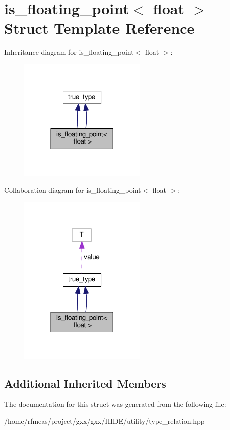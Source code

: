 \hypertarget{structis__floating__point_3_01float_01_4}{}\section{is\+\_\+floating\+\_\+point$<$ float $>$ Struct Template Reference}
\label{structis__floating__point_3_01float_01_4}


Inheritance diagram for is\+\_\+floating\+\_\+point$<$ float $>$\+:
\nopagebreak
\begin{figure}[H]
\begin{center}
\leavevmode
\includegraphics[width=173pt]{structis__floating__point_3_01float_01_4__inherit__graph}
\end{center}
\end{figure}


Collaboration diagram for is\+\_\+floating\+\_\+point$<$ float $>$\+:
\nopagebreak
\begin{figure}[H]
\begin{center}
\leavevmode
\includegraphics[width=173pt]{structis__floating__point_3_01float_01_4__coll__graph}
\end{center}
\end{figure}
\subsection*{Additional Inherited Members}


The documentation for this struct was generated from the following file\+:\begin{DoxyCompactItemize}
\item 
/home/rfmeas/project/gxx/gxx/\+H\+I\+D\+E/utility/type\+\_\+relation.\+hpp\end{DoxyCompactItemize}
